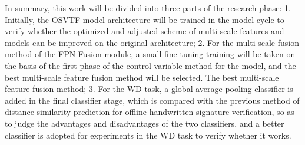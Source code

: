 In summary, this work will be divided into three parts of the research phase: 1. Initially, the OSVTF model architecture will be trained in the model cycle to verify whether the optimized and adjusted scheme of multi-scale features and models can be improved on the original architecture; 2. For the multi-scale fusion method of the FPN Fusion module, a small fine-tuning training will be taken on the basis of the first phase of the control variable method for the model, and the best multi-scale feature fusion method will be selected. The best multi-scale feature fusion method; 3. For the WD task, a global average pooling classifier is added in the final classifier stage, which is compared with the previous method of distance similarity prediction for offline handwritten signature verification, so as to judge the advantages and disadvantages of the two classifiers, and a better classifier is adopted for experiments in the WD task to verify whether it works.
